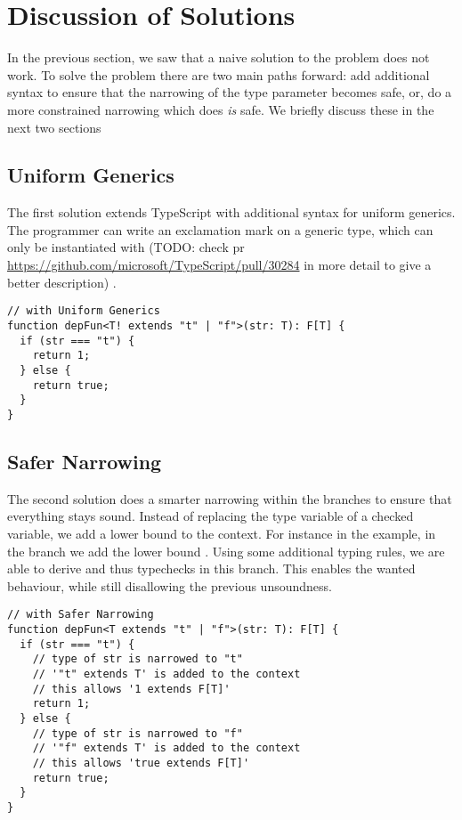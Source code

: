 \section{Discussion of Solutions}
\label{sec:solution}

In the previous section, we saw that a naive solution to the problem does not work. To solve the problem there are two main paths forward: add additional syntax to ensure that the narrowing of the type parameter becomes safe, or, do a more constrained narrowing which does \emph{is} safe. We briefly discuss these in the next two sections

\subsection{Uniform Generics}

The first solution extends TypeScript with additional syntax for uniform generics. The programmer can write an exclamation mark \ts{!} on a generic type, which can only be instantiated with (TODO: check pr \url{https://github.com/microsoft/TypeScript/pull/30284} in more detail to give a better description) .

\begin{lstlisting}
// with Uniform Generics
function depFun<T! extends "t" | "f">(str: T): F[T] {
  if (str === "t") {
    return 1;
  } else {
    return true;
  }
}
\end{lstlisting}


\subsection{Safer Narrowing}

The second solution does a smarter narrowing within the branches to ensure that everything stays sound. Instead of replacing the type variable  of a checked variable, we add a lower bound to the context. For instance in the  example, in the  branch we add the lower bound . Using some additional typing rules, we are able to derive  and thus  typechecks in this branch. This enables the wanted behaviour, while still disallowing the previous unsoundness.

\begin{lstlisting}
// with Safer Narrowing
function depFun<T extends "t" | "f">(str: T): F[T] {
  if (str === "t") {
    // type of str is narrowed to "t"
    // '"t" extends T' is added to the context
    // this allows '1 extends F[T]'
    return 1;
  } else {
    // type of str is narrowed to "f"
    // '"f" extends T' is added to the context
    // this allows 'true extends F[T]'
    return true;
  }
}
\end{lstlisting}

